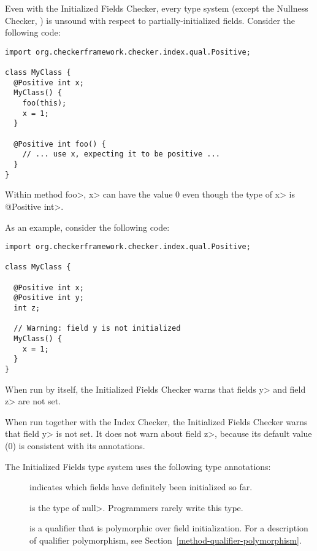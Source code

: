 
Even with the Initialized Fields Checker, every type system (except the
Nullness Checker, ) is unsound with
respect to partially-initialized fields.  Consider the following code:

\begin{Verbatim}
import org.checkerframework.checker.index.qual.Positive;

class MyClass {
  @Positive int x;
  MyClass() {
    foo(this);
    x = 1;
  }

  @Positive int foo() {
    // ... use x, expecting it to be positive ...
  }
}
\end{Verbatim}

\noindent
Within method \<foo>, \<x> can have the value 0 even though the type of
\<x> is \<@Positive int>.



As an example, consider the following code:

\begin{Verbatim}
import org.checkerframework.checker.index.qual.Positive;

class MyClass {

  @Positive int x;
  @Positive int y;
  int z;

  // Warning: field y is not initialized
  MyClass() {
    x = 1;
  }
}
\end{Verbatim}

When run by itself, the Initialized Fields Checker warns that fields \<y>
and field \<z> are not set.

When run together with the Index Checker, the Initialized Fields Checker
warns that field \<y> is not set.  It does not warn about field \<z>,
because its default value (0) is consistent with its annotations.



The Initialized Fields type system uses the following type annotations:
\begin{description}
\item[]
  indicates which fields have definitely been initialized so far.
\item[]
  is the type of \<null>.  Programmers rarely write this type.
\item[]
  is a qualifier that is polymorphic over field initialization.
  For a description of qualifier polymorphism, see
  Section~\ref{method-qualifier-polymorphism}.
\end{description}


